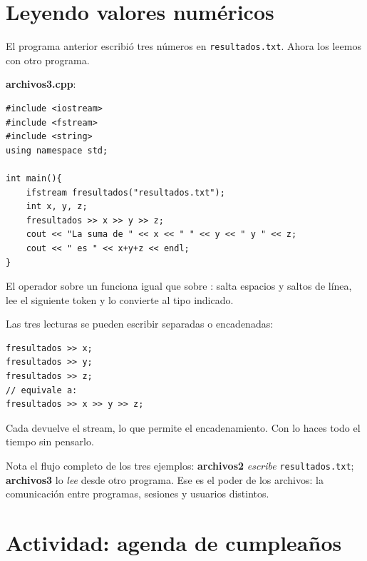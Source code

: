 \documentclass[12pt, oneside]{article}
\begin{document}
\section{Leyendo valores numéricos}

El programa anterior escribió tres números en \texttt{resultados.txt}.
Ahora los leemos con otro programa.

\textbf{archivos3.cpp}:
\begin{verbatim}
#include <iostream>
#include <fstream>
#include <string>
using namespace std;

int main(){
    ifstream fresultados("resultados.txt");
    int x, y, z;
    fresultados >> x >> y >> z;
    cout << "La suma de " << x << " " << y << " y " << z;
    cout << " es " << x+y+z << endl;
}
\end{verbatim}

El operador \cpp{>>} sobre un  funciona igual que sobre
: salta espacios y saltos de línea, lee el siguiente token y lo
convierte al tipo indicado.

\begin{ejemplo}
  Las tres lecturas se pueden escribir separadas o encadenadas:
  \begin{verbatim}
fresultados >> x;
fresultados >> y;
fresultados >> z;
// equivale a:
fresultados >> x >> y >> z;
  \end{verbatim}
  Cada \cpp{>>} devuelve el stream, lo que permite el encadenamiento.
  Con  lo haces todo el tiempo sin pensarlo.
\end{ejemplo}

\begin{consejo}
  Nota el flujo completo de los tres ejemplos:
  \textbf{archivos2} \textit{escribe} \texttt{resultados.txt};
  \textbf{archivos3} lo \textit{lee} desde otro programa.  Ese es el poder
  de los archivos: la comunicación entre programas, sesiones y usuarios
  distintos.
\end{consejo}

\section{Actividad: agenda de cumpleaños}
\end{document}
